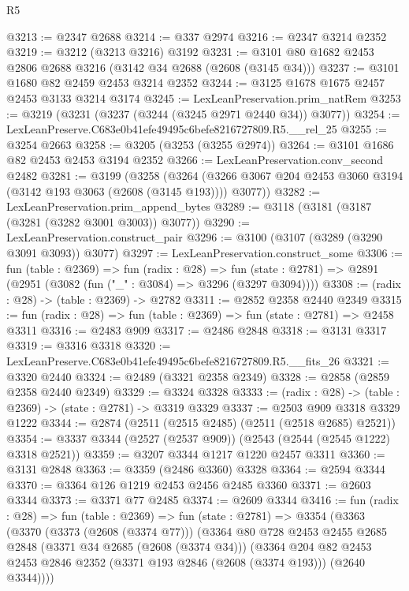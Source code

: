 \begin{lexlean}{R5}
\begin{coremodule}
@3213 := @2347 @2688
@3214 := @337 @2974
@3216 := @2347 @3214 @2352
@3219 := @3212 (@3213 @3216) @3192
@3231 := @3101 @80 @1682 @2453 @2806 @2688 @3216 (@3142 @34 @2688 (@2608 (@3145 @34)))
@3237 := @3101 @1680 @82 @2459 @2453 @3214 @2352
@3244 := @3125 @1678 @1675 @2457 @2453 @3133 @3214 @3174
@3245 := LexLeanPreservation.prim_natRem
@3253 := @3219 (@3231 (@3237 (@3244 (@3245 @2971 @2440 @34)) @3077))
@3254 := LexLeanPreserve.C683e0b41efe49495c6befe8216727809.R5.__rel_25
@3255 := @3254 @2663
@3258 := @3205 (@3253 (@3255 @2974))
@3264 := @3101 @1686 @82 @2453 @2453 @3194 @2352
@3266 := LexLeanPreservation.conv_second @2482
@3281 := @3199
    (@3258
      (@3264 (@3266 @3067 @204 @2453 @3060 @3194 (@3142 @193 @3063 (@2608 (@3145 @193)))) @3077))
@3282 := LexLeanPreservation.prim_append_bytes
@3289 := @3118 (@3181 (@3187 (@3281 (@3282 @3001 @3003)) @3077))
@3290 := LexLeanPreservation.construct_pair
@3296 := @3100 (@3107 (@3289 (@3290 @3091 @3093)) @3077)
@3297 := LexLeanPreservation.construct_some
@3306 := fun (table : @2369) =>
  fun (radix : @28) =>
  fun (state : @2781) => @2891 (@2951 (@3082 (fun ("_" : @3084) => @3296 (@3297 @3094))))
@3308 := (radix : @28) -> (table : @2369) -> @2782
@3311 := @2852 @2358 @2440 @2349
@3315 := fun (radix : @28) => fun (table : @2369) => fun (state : @2781) => @2458 @3311
@3316 := @2483 @909
@3317 := @2486 @2848
@3318 := @3131 @3317
@3319 := @3316 @3318
@3320 := LexLeanPreserve.C683e0b41efe49495c6befe8216727809.R5.__fits_26
@3321 := @3320 @2440
@3324 := @2489 (@3321 @2358 @2349)
@3328 := @2858 (@2859 @2358 @2440 @2349)
@3329 := @3324 @3328
@3333 := (radix : @28) -> (table : @2369) -> (state : @2781) -> @3319 @3329
@3337 := @2503 @909 @3318 @3329 @1222
@3344 := @2874 (@2511 (@2515 @2485) (@2511 (@2518 @2685) @2521))
@3354 := @3337 @3344 (@2527 (@2537 @909)) (@2543 (@2544 (@2545 @1222) @3318 @2521))
@3359 := @3207 @3344 @1217 @1220 @2457 @3311
@3360 := @3131 @2848
@3363 := @3359 (@2486 @3360) @3328
@3364 := @2594 @3344
@3370 := @3364 @126 @1219 @2453 @2456 @2485 @3360
@3371 := @2603 @3344
@3373 := @3371 @77 @2485
@3374 := @2609 @3344
@3416 := fun (radix : @28) =>
  fun (table : @2369) =>
  fun (state : @2781) =>
  @3354
    (@3363
      (@3370
        (@3373 (@2608 (@3374 @77)))
        (@3364
          @80
          @728
          @2453
          @2455
          @2685
          @2848
          (@3371 @34 @2685 (@2608 (@3374 @34)))
          (@3364
            @204
            @82
            @2453
            @2453
            @2846
            @2352
            (@3371 @193 @2846 (@2608 (@3374 @193)))
            (@2640 @3344))))

\end{coremodule}
\end{lexlean}
